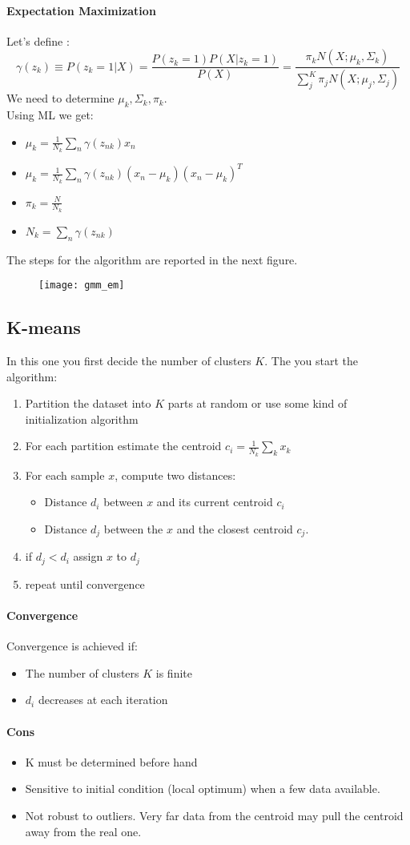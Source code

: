 \paragraph{Expectation Maximization}
Let's define :
$$\gamma(z_k) \equiv P(z_k=1|X)=\frac{P(z_k=1)P(X|z_k=1)}{P(X)}=\frac{\pi_k N(X;\mu_k,\Sigma_k)}{\sum_j^K \pi_j N(X;\mu_j,\Sigma_j)}$$
We need to determine $\mu_k, \Sigma_k, \pi_k$.\\
Using ML we get:
\begin{itemize}
\item $\mu_k=\frac{1}{N_k}\sum_n \gamma(z_{nk})x_n$
\item $\mu_k=\frac{1}{N_k}\sum_n \gamma(z_{nk})(x_n-\mu_k)(x_n-\mu_k)^T$
\item $\pi_k=\frac{N}{N_k}$
\item $N_k=\sum_n\gamma(z_{nk})$
\end{itemize}

The steps for the algorithm are reported in the next figure.

\begin{figure}[H]
\centering
\texttt{[image: gmm\_em]}
\end{figure}

\subsection{K-means}
In this one you first decide the number of clusters $K$. The you start the algorithm:
\begin{enumerate}
\item Partition the dataset into $K$ parts at random or use some kind of initialization algorithm
\item For each partition estimate the centroid $c_i=\frac{1}{N_k}\sum_k x_k$ 
\item For each sample $x$, compute two distances:
\begin{itemize}
\item Distance $d_i$ between $x$ and its current centroid $c_i$ 
\item Distance $d_{j}$ between the $x$ and the closest centroid $c_j$.
\end{itemize}
\item if $d_j<d_i$ assign $x$ to $d_j$
\item repeat until convergence
\end{enumerate}

\paragraph{Convergence}
Convergence is achieved if:
\begin{itemize}
\item The number of clusters $K$ is finite
\item $d_i$ decreases at each iteration 
\end{itemize}

\paragraph{Cons}
\begin{itemize}
\item K must be determined before hand
\item Sensitive to initial condition (local optimum) when a few data available.
\item Not robust to outliers. Very far data from the centroid may pull the centroid away from the real one.
\end{itemize}